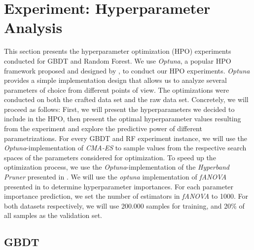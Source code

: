 \section{Experiment: Hyperparameter Analysis}\label{sec:hpo}
This section presents the hyperparameter optimization (HPO) experiments conducted for GBDT and Random Forest. 
We use \textit{Optuna}, a popular HPO framework proposed and designed by \cite{akiba2019optuna}, to conduct our HPO experiments. 
\textit{Optuna} provides a simple implementation design that allows us to analyze several parameters of choice from different points of view. 
The optimizations were conducted on both the crafted data set and the raw data set. 
Concretely, we will proceed as follows: First, we will present the hyperparameters we decided to include in the HPO, then present the optimal hyperparameter values resulting from the experiment and explore the predictive power of different parametrizations. 
For every GBDT and RF experiment instance, we will use the \textit{Optuna}-implementation of \textit{CMA-ES} to sample values from the respective search spaces of the parameters considered for optimization. To speed up the optimization process, we use the \textit{Optuna}-implementation of the \textit{Hyperband Pruner} presented in \cite{li2018hyperband}.
We will use the \textit{optuna} implementation of \textit{fANOVA} presented in \cite{fANOVA} to determine hyperparameter importances. 
For each parameter importance prediction, we set the number of estimators in \textit{fANOVA} to 1000.
For both datasets respectively, we will use 200.000 samples for training, and 20\% of all samples as the validation set.
\subsection{GBDT}

